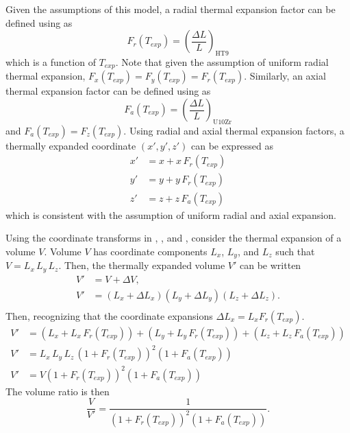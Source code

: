   Given the assumptions of this model, a radial thermal expansion factor can be
  defined using  as
  \begin{equation}
    \label{eq:lef_r}
    F_r(T_{exp}) = \left(\frac{\Delta L}{L}\right)_{\text{HT9}}
  \end{equation}
  which is a function of $T_{exp}$. Note that given the assumption of uniform
  radial thermal expansion, ${F_x(T_{exp}) = F_y(T_{exp}) = F_r(T_{exp})}$.
  Similarly, an axial thermal expansion factor can be defined using
   as 
  \begin{equation}
    \label{eq:lef_a}
    F_a(T_{exp}) = \left(\frac{\Delta L}{L}\right)_{\text{U10Zr}}
  \end{equation}
  and $F_a(T_{exp}) = F_z(T_{exp})$. Using radial and axial thermal expansion
  factors, a thermally expanded coordinate $(x',y',z')$ can be expressed as
  \begin{align}
    \label{eq:expand_x}
    x' &= x + x \, F_r(T_{exp}) \\
    \label{eq:expand_y}
    y' &= y + y \, F_r(T_{exp}) \\
    \label{eq:expand_z}
    z' &= z + z \, F_a(T_{exp})
  \end{align}
  which is consistent with the assumption of uniform radial and axial expansion.

  Using the coordinate transforms in , , and
  , consider the thermal expansion of a volume $V$. Volume $V$
  has coordinate components $L_x$, $L_y$, and $L_z$ such that 
  ${V = L_x \, L_y \, L_z}$. Then, the thermally expanded volume $V'$ can be
  written
  \begin{align}
    V' &= V + \Delta V, \\
    V' &= (L_x + \Delta L_x) (L_y + \Delta L_y) (L_z + \Delta L_z). \\
  \end{align}
  Then, recognizing that the coordinate expansions $\Delta L_x = L_x
  F_r(T_{exp})$.
  \begin{align}
    V' &= (L_x + L_x \, F_r(T_{exp})) + (L_y + L_y \, F_r(T_{exp})) + 
      (L_z + L_z \, F_a(T_{exp})) \\
    V' &= L_x \, L_y \, L_z \, (1 + F_r(T_{exp}))^2 (1+F_a(T_{exp})) \\
    V' &= V (1 + F_r(T_{exp}))^2 (1+F_a(T_{exp}))
  \end{align}
  The volume ratio is then
  \begin{equation}
    \label{eq:volume_ratio}
    \frac{V}{V'} = \frac{1}{(1+F_r(T_{exp}))^2 (1+F_a(T_{exp}))}.
  \end{equation}

